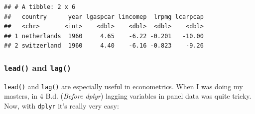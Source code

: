 \documentclass[]{gitbook}
\newenvironment{Shaded}{\begin{snugshade}}{\end{snugshade}}
\newcommand{\DataTypeTok}[1]{\textcolor[rgb]{0.13,0.29,0.53}{#1}}
\newcommand{\DecValTok}[1]{\textcolor[rgb]{0.00,0.00,0.81}{#1}}
\newcommand{\KeywordTok}[1]{\textcolor[rgb]{0.13,0.29,0.53}{\textbf{#1}}}
\newcommand{\NormalTok}[1]{#1}
\newcommand{\OperatorTok}[1]{\textcolor[rgb]{0.81,0.36,0.00}{\textbf{#1}}}
\newcommand{\StringTok}[1]{\textcolor[rgb]{0.31,0.60,0.02}{#1}}
\theoremstyle{definition}
\theoremstyle{definition}
\theoremstyle{definition}
\theoremstyle{remark}
\begin{document}
\begin{Shaded}
\end{Shaded}

\begin{verbatim}
## # A tibble: 2 x 6
##   country      year lgaspcar lincomep  lrpmg lcarpcap
##   <chr>       <int>    <dbl>    <dbl>  <dbl>    <dbl>
## 1 netherlands  1960     4.65    -6.22 -0.201   -10.00
## 2 switzerland  1960     4.40    -6.16 -0.823    -9.26
\end{verbatim}

\hypertarget{lead-and-lag}{%
\subsubsection{\texorpdfstring{\texttt{lead()} and
\texttt{lag()}}{lead() and lag()}}\label{lead-and-lag}}

\texttt{lead()} and \texttt{lag()} are especially useful in
econometrics. When I was doing my masters, in 4 B.d. (\emph{Before
dplyr}) lagging variables in panel data was quite tricky. Now, with
\texttt{dplyr} it's really very easy:

\begin{Shaded}
\end{Shaded}
\end{document}
